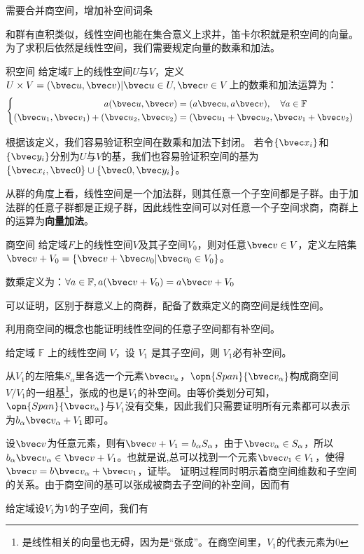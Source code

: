 

\begin{issues}
\issueDraft 
需要合并商空间，增加补空间词条
\end{issues}
和群有直积类似，线性空间也能在集合意义上求并，笛卡尔积就是积空间的向量。为了求积后依然是线性空间，我们需要规定向量的数乘和加法。

\begin{definition}{积空间}
给定域$\mathbb F $上的线性空间$U$与$V$，定义$U\times V={(\bvec u,\bvec v)|\bvec u\in U,\bvec v\in V}$上的数乘和加法运算为：
\begin{equation}
\left\{\begin{aligned}
a(\bvec u,\bvec v)&=(a\bvec u,a\bvec v),\quad \forall a\in \mathbb F\\
(\bvec u_1,\bvec v_1)+(\bvec u_2,\bvec v_2)&=(\bvec u_1+\bvec u_2,\bvec v_1+\bvec v_2)
\end{aligned}\right.~
\end{equation}
\end{definition}
根据该定义，我们容易验证积空间在数乘和加法下封闭。
若令$\{\bvec x_i\}$和$\{\bvec y_i\}$分别为$U$与$V$的基，我们也容易验证积空间的基为$\{\bvec x_i,\bvec 0\}\cup \{\bvec 0,\bvec y_i\}$。

从群的角度上看，线性空间是一个加法群，则其任意一个子空间都是子群。由于加法群的任意子群都是正规子群，因此线性空间可以对任意一个子空间求商，商群上的运算为\textbf{向量加法}。
\begin{definition}{商空间}
给定域$F$上的线性空间$V$及其子空间$V_0$，则对任意$\bvec v\in V$，定义左陪集$\bvec v+V_0=\{\bvec v+\bvec v_0|\bvec v_0\in V_0\}$。

数乘定义为：$\forall a\in \mathbb F,a(\bvec v+V_0)=a\bvec v+V_0$
\end{definition}
可以证明，区别于群意义上的商群，配备了数乘定义的商空间是线性空间。

利用商空间的概念也能证明线性空间的任意子空间都有补空间。
\begin{theorem}{}
给定域 $\mathbb F$ 上的线性空间 $V$，设 $V_1$ 是其子空间，则 $V_1$必有补空间。
\end{theorem}
从$V_1$的左陪集${S_{\alpha}}$里各选一个元素$\bvec v_a$，$\opn{Span} \{\bvec v_{\alpha}\}$构成商空间$V/V_1$的一组基\footnote{是线性相关的向量也无碍，因为是“张成”。在商空间里，$V_1$的代表元素为$0$}，张成的也是$V_1$的补空间。由等价类划分可知，$\opn{Span} \{\bvec v_{\alpha}\}$与$V_1$没有交集，因此我们只需要证明所有元素都可以表示为$b_{\alpha}\bvec v_{\alpha}+V_1$即可。

设$\bvec v$为任意元素，则有$\bvec v+V_1=b_{\alpha} S_{\alpha}$，由于$\bvec v_{\alpha}\in S_{\alpha}$，所以$b_{\alpha} \bvec v_{\alpha}\in\bvec v+V_1$。也就是说,总可以找到一个元素$\bvec v_1\in V_1$，使得$\bvec v=b\bvec v_{\alpha}+\bvec v_1$，证毕。
证明过程同时明示着商空间维数和子空间的关系。由于商空间的基可以张成被商去子空间的补空间，因而有
\begin{theorem}{}
给定域设$V_1$为$V$的子空间，我们有

\end{theorem}